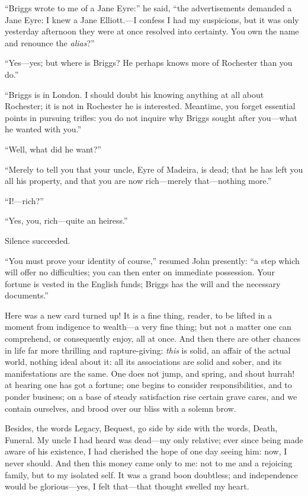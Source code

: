 \enquote{Briggs wrote to me of a Jane Eyre:} he said, \enquote{the
	advertisements demanded a Jane Eyre: I knew a Jane Elliott.---I confess
	I had my suspicions, but it was only yesterday afternoon they were at
	once resolved into certainty. You own the name and renounce the
	\emph{alias}?}

\enquote{Yes---yes; but where is \Mr{} Briggs? He perhaps knows more of
	\Mr{} Rochester than you do.}

\enquote{Briggs is in London. I should doubt his knowing anything at
	all about \Mr{} Rochester; it is not in \Mr{} Rochester he is interested.
	Meantime, you forget essential points in pursuing trifles: you do not
	inquire why \Mr{} Briggs sought after you---what he wanted with you.}

\enquote{Well, what did he want?}

\enquote{Merely to tell you that your uncle, \Mr{} Eyre of Madeira, is
	dead; that he has left you all his property, and that you are now
	rich---merely that---nothing more.}

\enquote{I!---rich?}

\enquote{Yes, you, rich---quite an heiress.}

Silence succeeded.

\enquote{You must prove your identity of course,} resumed \St{} John
presently: \enquote{a step which will offer no difficulties; you can
	then enter on immediate possession. Your fortune is vested in the
	English funds; Briggs has the will and the necessary documents.}

Here was a new card turned up! It is a fine thing, reader, to be lifted
in a moment from indigence to wealth---a very fine thing; but not a
matter one can comprehend, or consequently enjoy, all at once. And then
there are other chances in life far more thrilling and rapture-giving:
\emph{this} is solid, an affair of the actual world, nothing ideal about
it: all its associations are solid and sober, and its manifestations are
the same. One does not jump, and spring, and shout hurrah! at hearing
one has got a fortune; one begins to consider responsibilities, and to
ponder business; on a base of steady satisfaction rise certain grave
cares, and we contain ourselves, and brood over our bliss with a solemn
brow.

Besides, the words Legacy, Bequest, go side by side with the words,
Death, Funeral. My uncle I had heard was dead---my only relative; ever
since being made aware of his existence, I had cherished the hope of one
day seeing him: now, I never should. And then this money came only to
me: not to me and a rejoicing family, but to my isolated self. It was a
grand boon doubtless; and independence would be glorious---yes, I felt
that---that thought swelled my heart.

